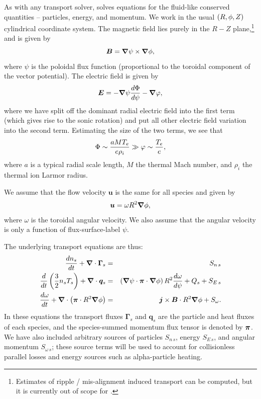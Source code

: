 \documentclass{revtex4-2}
\providecommand{\pitens}{\tensor{\pi}}
\begin{document}
As with any transport solver, \mctrans{} solves equations for the fluid-like conserved quantities -- particles, energy, and momentum.
We work in the usual $(R,\phi,Z)$ cylindrical coordinate system.
The magnetic field lies purely in the $R-Z$ plane,\footnote{Estimates of ripple / mis-alignment induced transport can be computed, but it is currently out of scope for \mctrans{}.}
and is given by
\begin{equation}
\bm{B} = \bm{\nabla}\psi\times\bm{\nabla} \phi,
\end{equation}
where $\psi$ is the poloidal flux function (proportional to the toroidal component of the vector potential).
The electric field is given by
\begin{equation}
\bm{E} = -\bm{\nabla} \psi \frac{d \Phi}{d\psi} - \bm{\nabla} \varphi,
\end{equation}
where we have split off the dominant radial electric field into the first term (which gives rise to the sonic rotation) and put all other electric field variation into the second term. Estimating the size of the two terms, we see that
\begin{equation}
\Phi \sim \frac{a M T_e}{e \rho_i} \gg \varphi \sim \frac{T_e}{e},
\end{equation}
where $a$ is a typical radial scale length, $M$ the thermal Mach number, and $\rho_i$ the thermal ion Larmor radius.

We assume that the flow velocity $\bm{u}$ is the same for all species and given by
\begin{equation}
\bm{u} = \omega R^2 \bm{\nabla}\phi,
\end{equation}
where $\omega$ is the toroidal angular velocity. We also assume that the angular velocity is only a function of flux-surface-label $\psi$.

The underlying transport equations are thus:
\begin{eqnarray}
\label{parttrans}
\frac{d n_s}{dt} + \dv\bm{\Gamma}_s &=& S_{n\,s}\\
		\label{heattrans}
\frac{d}{dt} \left( \frac{3}{2} n_s T_s \right) + \dv\bm{q}_s &=& \left(\grad\psi \cdot \pitens \cdot \grad\tor\right) R^2 \frac{d\omega}{d \psi}   + Q_s + S_{E\,s}\\
	\label{momtrans}
\frac{d \omega}{dt} + \dv\left(\pitens\cdot R^2\grad\tor\right) &=& \bm{j} \times\bm{B} \cdot R^2\grad\tor + S_{\omega}.
\end{eqnarray}
In these equations the transport fluxes $\bm{\Gamma}_s$ and $\bm{q}_s$ are the particle and heat fluxes of each species, and the species-summed momentum flux tensor is denoted by $\pitens$. We have also included arbitrary sources of particles $S_{n\,s}$, energy $S_{E\,s}$, and angular momentum $S_{\omega\,s}$; these source terms will be used to account for collisionless parallel losses and energy sources such as alpha-particle heating.
\end{document}
